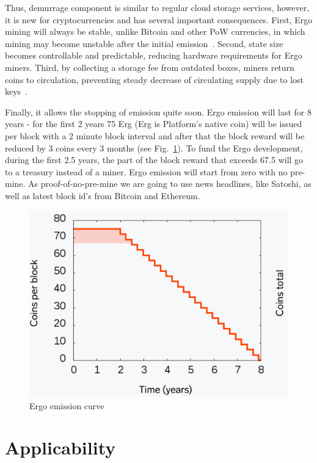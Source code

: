 \documentclass[]{article}
\begin{document}
    Thus, demurrage component is similar to regular cloud storage services, however, it is new for
    cryptocurrencies and has several important consequences. First, Ergo mining will always be
    stable, unlike Bitcoin and other PoW currencies, in which mining may become unstable after the
    initial emission~\cite{carlsten2016instability}. Second, state size becomes controllable and predictable, reducing
    hardware requirements for Ergo miners. Third, by collecting a storage fee from outdated boxes,
    miners return coins to circulation, preventing steady decrease of circulating supply due to lost
    keys~\cite{wsj2018}.

    Finally, it allows the stopping of emission quite soon. Ergo emission will last for 8 years - for the
    first 2 years 75 Erg (Erg is Platform's native coin) will be issued per block with a 2 minute block
    interval and after that the block reward will be reduced by 3 coins every 3 months (see Fig.~\ref{fig:emission}).
    To fund the Ergo development, during the first 2.5 years, the part of the block reward that
    exceeds 67.5 will go to a treasury instead of a miner. Ergo emission will start from zero with no
    pre-mine. As proof-of-no-pre-mine we are going to use news headlines, like Satoshi, as well as
    latest block id's from Bitcoin and Ethereum.

    \begin{figure}[h]
        \centering
        \includegraphics[width=\textwidth]{emission.png}
        \caption{Ergo emission curve
        \label{fig:emission} }
    \end{figure}


    \section{Applicability}
\end{document}

